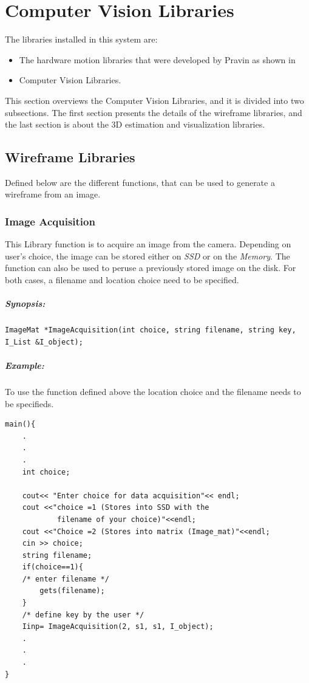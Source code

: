 
\chapter{Computer Vision Libraries}
\label{chap:Library}
The libraries installed in this system are: 
\begin{itemize}
\item The hardware motion libraries that were developed by Pravin as shown in \cite{dhake2007real,dhake2007real1}
\item Computer Vision Libraries. 
\end{itemize}
 
This section overviews the Computer Vision Libraries, and it is divided into two subsections. The first section presents the details of the wireframe libraries, and the last section is about the 3D estimation and visualization libraries.

\section{Wireframe Libraries}
\label{sec:Wireframe}
 Defined below are the different functions, that can be used to generate a wireframe from an image. 
\subsection{Image Acquisition}
This Library function is to acquire an image from the camera. Depending on user's choice, the image can be stored either on \textit{SSD} or on the \textit{Memory}. The function can also be used to peruse a previously stored image on the disk. For both cases, a filename and location choice need to be specified.
\paragraph{Synopsis:}
\begin{lstlisting}
ImageMat *ImageAcquisition(int choice, string filename, string key, I_List &I_object);
\end{lstlisting}
\paragraph{Example:}
To use the function defined above the location choice and the filename needs to be specifieds.
\begin{lstlisting}
main(){ 
	.
	.
	.
	int choice;

	cout<< "Enter choice for data acquisition"<< endl;
	cout <<"choice =1 (Stores into SSD with the    
   	        filename of your choice)"<<endl; 
	cout <<"Choice =2 (Stores into matrix (Image_mat)"<<endl;
	cin >> choice; 
	string filename;
	if(choice==1){
	/* enter filename */
		gets(filename);
	}
	/* define key by the user */
	Iinp= ImageAcquisition(2, s1, s1, I_object);
	.
	.
	.
}
\end{lstlisting}

